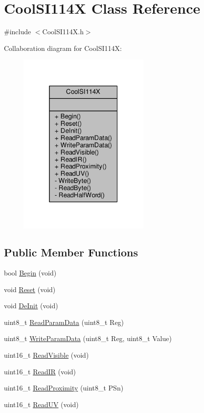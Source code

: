 \hypertarget{class_cool_s_i114_x}{}\section{Cool\+S\+I114X Class Reference}
\label{class_cool_s_i114_x}


{\ttfamily \#include $<$Cool\+S\+I114\+X.\+h$>$}



Collaboration diagram for Cool\+S\+I114X\+:\nopagebreak
\begin{figure}[H]
\begin{center}
\leavevmode
\includegraphics[width=184pt]{dc/d2d/class_cool_s_i114_x__coll__graph}
\end{center}
\end{figure}
\subsection*{Public Member Functions}
\begin{DoxyCompactItemize}
\item 
bool \hyperlink{class_cool_s_i114_x_a206b36aca7049f63be1d11088c30a09f}{Begin} (void)
\item 
void \hyperlink{class_cool_s_i114_x_a9d9f9c9129c0c29ed497f8563f3dd823}{Reset} (void)
\item 
void \hyperlink{class_cool_s_i114_x_a6840abd53a2e3d71a6bb918077c6d6e6}{De\+Init} (void)
\item 
uint8\+\_\+t \hyperlink{class_cool_s_i114_x_a33cf431103c722442f6a0cc93848d640}{Read\+Param\+Data} (uint8\+\_\+t Reg)
\item 
uint8\+\_\+t \hyperlink{class_cool_s_i114_x_abf45eb10a6de1be16e68a51624fa2608}{Write\+Param\+Data} (uint8\+\_\+t Reg, uint8\+\_\+t Value)
\item 
uint16\+\_\+t \hyperlink{class_cool_s_i114_x_a42e0e574256341443c647a4c0eda87d5}{Read\+Visible} (void)
\item 
uint16\+\_\+t \hyperlink{class_cool_s_i114_x_abc536ee7ae8e3ba9d1069acc3889a2cf}{Read\+IR} (void)
\item 
uint16\+\_\+t \hyperlink{class_cool_s_i114_x_a194fede1105508c7803dbb567cbdcc67}{Read\+Proximity} (uint8\+\_\+t P\+Sn)
\item 
uint16\+\_\+t \hyperlink{class_cool_s_i114_x_a14ced664d74e93438440b0274109c111}{Read\+UV} (void)
\end{DoxyCompactItemize}
